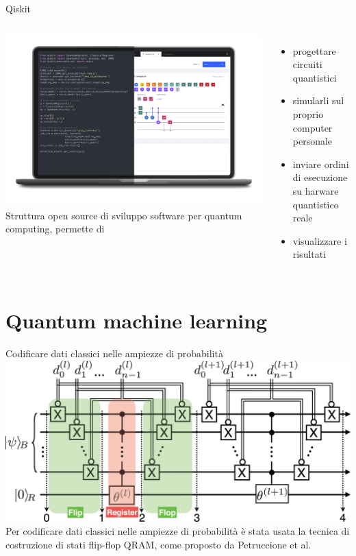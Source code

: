 \documentclass{beamer}
\begin{document}
    \begin{frame}{Qiskit}
        \begin{columns}
            \includegraphics[width=\textwidth]{gfx/laptop_strumenti.png}
            Struttura open source di sviluppo software per quantum computing, permette di 
            \begin{itemize}
                \item progettare circuiti quantistici
                \item simularli sul proprio computer personale
                \item inviare ordini di esecuzione su harware quantistico reale
                \item visualizzare i risultati
            \end{itemize}
        \end{columns}
    \end{frame}

    \section{Quantum machine learning}

    \begin{frame}{Codificare dati classici nelle ampiezze di probabilità}
        \includegraphics[width=\textwidth]{gfx/qram.png}
        Per codificare dati classici nelle ampiezze di probabilità è stata usata la tecnica di costruzione 
        di stati flip-flop QRAM, come proposto da Petruccione et al. 
    \end{frame}
\end{document}
